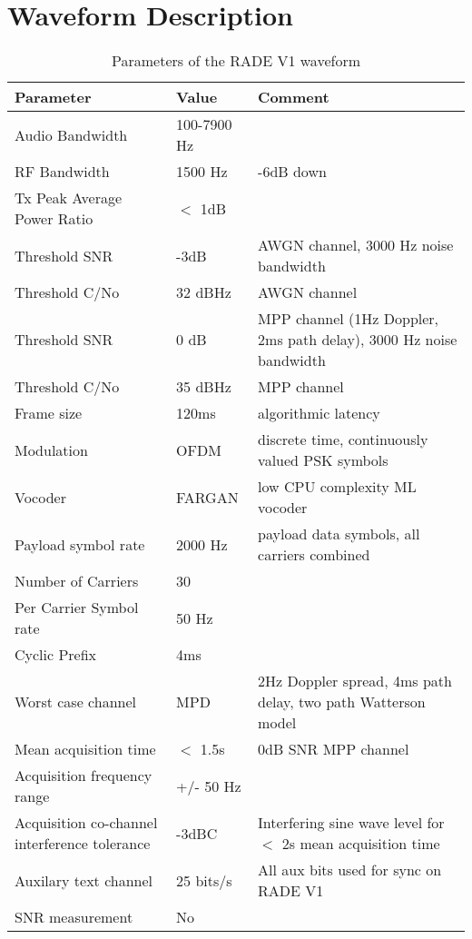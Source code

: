 \documentclass{article}
\begin{document}
\section{Waveform Description}

\begin{table} [H]
\centering
\begin{tabular}{m{5cm} | m{3cm} | m{5cm} }
 \hline
 Parameter & Value & Comment \\
 \hline
 Audio Bandwidth & 100-7900 Hz \\
 RF Bandwidth & 1500 Hz & -6dB down  \\
 Tx Peak Average Power Ratio & $<$ 1dB \\
 Threshold SNR & -3dB & AWGN channel, 3000 Hz noise bandwidth \\
 Threshold C/No & 32 dBHz & AWGN channel \\
 Threshold SNR & 0 dB & MPP channel (1Hz Doppler, 2ms path delay), 3000 Hz noise bandwidth \\
 Threshold C/No & 35 dBHz & MPP channel \\
 Frame size & 120ms & algorithmic latency \\
 Modulation & OFDM & discrete time, continuously valued PSK symbols \\
 Vocoder & FARGAN & low CPU complexity ML vocoder \\
 Payload symbol rate & 2000 Hz & payload data symbols, all carriers combined \\
 Number of Carriers & 30 \\
 Per Carrier Symbol rate & 50 Hz \\
 Cyclic Prefix & 4ms \\
 Worst case channel & MPD & 2Hz Doppler spread, 4ms path delay, two path Watterson model \\
 Mean acquisition time & $<$ 1.5s & 0dB SNR MPP channel \\
 Acquisition frequency range & +/- 50 Hz \\
 Acquisition co-channel interference tolerance & -3dBC & Interfering sine wave level for $<$ 2s mean acquisition time \\
 Auxilary text channel & 25 bits/s & All aux bits used for sync on RADE V1 \\
 SNR measurement & No \\
\hline
\end{tabular}
\caption{Parameters of the RADE V1 waveform}
\label{tab:constant_eb}
\end{table}
\end{document}
